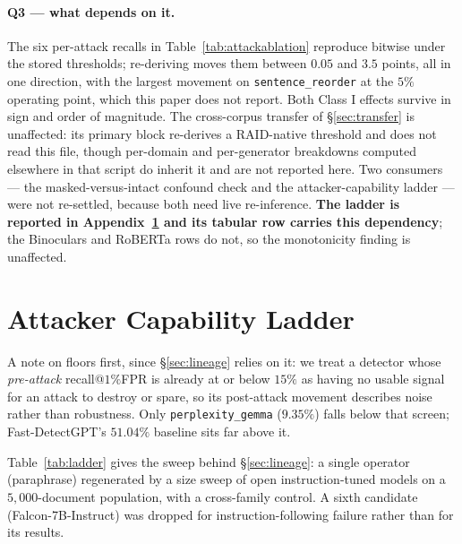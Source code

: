 \documentclass{article}
\begin{document}
\paragraph{Q3 --- what depends on it.} The six per-attack recalls in
Table~\ref{tab:attackablation} reproduce bitwise under the stored thresholds;
re-deriving moves them between $0.05$ and $3.5$ points, all in one direction,
with the largest movement on \texttt{sentence\_reorder} at the $5\%$ operating
point, which this paper does not report. Both Class I effects survive in sign
and order of magnitude. The cross-corpus transfer of \S\ref{sec:transfer} is
unaffected: its primary block re-derives a RAID-native threshold and does not
read this file, though per-domain and per-generator breakdowns computed elsewhere
in that script do inherit it and are not reported here. Two consumers --- the
masked-versus-intact confound check and the attacker-capability ladder --- were
not re-settled, because both need live re-inference. \textbf{The ladder is
reported in Appendix~\ref{app:ladder} and its tabular row carries this
dependency}; the Binoculars and RoBERTa rows do not, so the monotonicity finding
is unaffected.

\section{Attacker Capability Ladder}
\label{app:ladder}

A note on floors first, since \S\ref{sec:lineage} relies on it: we treat a
detector whose \emph{pre-attack} recall@$1\%$FPR is already at or below $15\%$
as having no usable signal for an attack to destroy or spare, so its post-attack
movement describes noise rather than robustness. Only \texttt{perplexity\_gemma}
($9.35\%$) falls below that screen; Fast-DetectGPT's $51.04\%$ baseline sits far
above it.

Table~\ref{tab:ladder} gives the sweep behind \S\ref{sec:lineage}: a single
operator (paraphrase) regenerated by a size sweep of open instruction-tuned
models on a $5{,}000$-document population, with a cross-family control. A sixth
candidate (Falcon-7B-Instruct) was dropped for instruction-following failure
rather than for its results.
\end{document}
